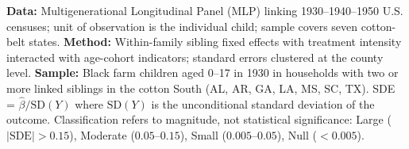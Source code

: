 \begin{table}[H]
{\textbf{Data:} Multigenerational Longitudinal Panel (MLP) linking 1930--1940--1950 U.S. censuses; unit of observation is the individual child; sample covers seven cotton-belt states.
\textbf{Method:} Within-family sibling fixed effects with treatment intensity interacted with age-cohort indicators; standard errors clustered at the county level.
\textbf{Sample:} Black farm children aged 0--17 in 1930 in households with two or more linked siblings in the cotton South (AL, AR, GA, LA, MS, SC, TX).
SDE = $\hat{\beta} / \text{SD}(Y)$ where $\text{SD}(Y)$ is the unconditional standard deviation of the outcome.
Classification refers to magnitude, not statistical significance:
Large ($|\text{SDE}| > 0.15$), Moderate ($0.05$--$0.15$), Small ($0.005$--$0.05$), Null ($< 0.005$).}
\end{table}
